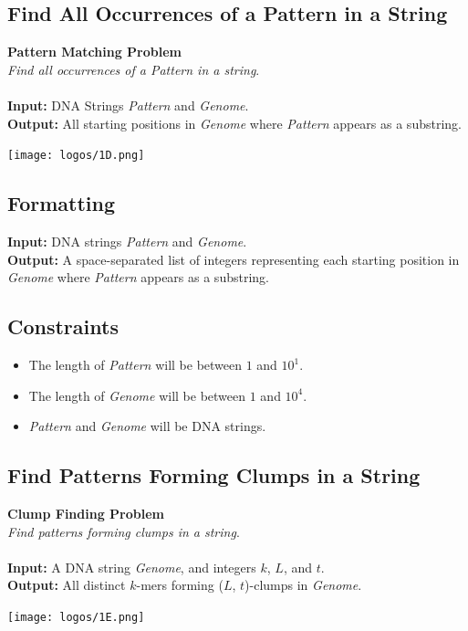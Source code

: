 \documentclass{article}
\begin{document}
\subsection{Find All Occurrences of a Pattern in a String}
\hline\vspace{5}
\noindent \textbf{Pattern Matching Problem}\\
\emph{Find all occurrences of a Pattern in a string}.\\ \\
\textbf{Input:} DNA Strings \emph{Pattern} and \emph{Genome}.\\
\textbf{Output:} All starting positions in \emph{Genome} where \emph{Pattern} appears as a substring.
\begin{center}
    \texttt{[image: logos/1D.png]} 
\end{center}
\hline\vspace{5}

\subsection*{Formatting}
\textbf{Input:} DNA strings \emph{Pattern} and \emph{Genome}.\\
\noindent \textbf{Output:} A space-separated list of integers representing each starting position in \emph{Genome} where \emph{Pattern} appears as a substring.

\subsection*{Constraints}
\begin{itemize}
    \item The length of \emph{Pattern} will be between $1$ and $10^1$.
    \item The length of \emph{Genome} will be between $1$ and $10^4$.
    \item \emph{Pattern} and \emph{Genome} will be DNA strings.
\end{itemize}
\pagebreak
\subsection{Find Patterns Forming Clumps in a String}
\hline\vspace{5}
\noindent \textbf{Clump Finding Problem}\\
\emph{Find patterns forming clumps in a string}.\\ \\
\textbf{Input:} A DNA string \emph{Genome}, and integers $k$, $L$, and $t$.\\
\textbf{Output:} All distinct $k$-mers forming ($L$, $t$)-clumps in \emph{Genome}.
\begin{center}
    \texttt{[image: logos/1E.png]} 
\end{center}
\hline\vspace{5}
\end{document}

